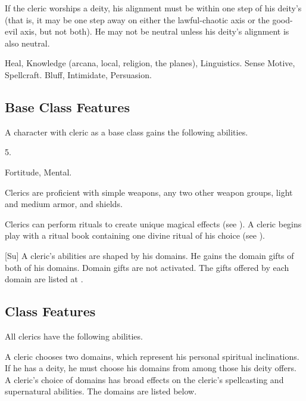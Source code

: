  If the cleric worships a deity, his alignment must be within one step of his deity's (that is, it may be one step away on either the lawful-chaotic axis or the good-evil axis, but not both).
He may not be neutral unless his deity's alignment is also neutral.

 Heal, Knowledge (arcana, local, religion, the planes), Linguistics.
 Sense Motive, Spellcraft.
 Bluff, Intimidate, Persuasion.

\subsection{Base Class Features}
A character with cleric as a base class gains the following abilities.

 5.

  Fortitude,  Mental.

 Clerics are proficient with simple weapons, any two other weapon groups, light and medium armor, and shields.

Clerics can perform rituals to create unique magical effects (see ).
A cleric begins play with a ritual book containing one divine ritual of his choice (see ).

[Su]
A cleric's abilities are shaped by his domains.
He gains the domain gifts of both of his domains.
Domain gifts are not activated.
The gifts offered by each domain are listed at .

\subsection{Class Features}
All clerics have the following abilities.

A cleric chooses two domains, which represent his personal spiritual inclinations.
If he has a deity, he must choose his domains from among those his deity offers.
A cleric's choice of domains has broad effects on the cleric's spellcasting and supernatural abilities.
The domains are listed below.

